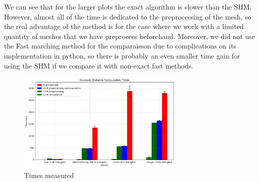 \documentclass[sigconf]{acmart}
\begin{document}
We can see that for the larger plots the exact algorithm is slower than the SHM. 
However, almost all of the time is dedicated to the preprocessing of the mesh, 
so the real advantage of the method is for the case where we work with a limited
quantity of meshes that we have preprocess beforehand. Moreover, we did not
use the Fast marching method for the comparaisson due to complications on its
implementation in python, so there is probably an even smaller time gain for using
the SHM if we compare it with non-exact fast methods.

\begin{figure}
  \centering
  \includegraphics[width=8cm]{time_graphs.png}
  \caption{Times measured}
  \label{fig:time_graphs}
\end{figure}



\end{document}
